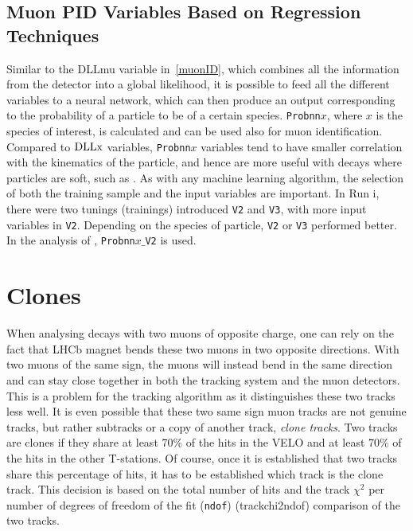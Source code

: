 \subsection{Muon PID Variables Based on Regression Techniques }
\label{muonPIDprobnn}
Similar to the DLLmu variable in~\autoref{muonID}, which combines all the information from the detector into a global likelihood, it is possible to feed all the different variables to a neural network, which can then produce an output corresponding to the probability of a particle to be of a certain species. \texttt{Probnn${x}$}, where $x$ is the species of interest, is calculated and can be used also for muon identification. Compared to $\rm{DLLx}$ variables, \texttt{Probnn${x}$} variables tend to have smaller correlation with the kinematics of the particle, and hence are more useful with decays where particles are soft, such as \Bmumumu. As with any machine learning algorithm, the selection of both the training sample and the input variables are important. In Run \Rn{1}, there were two tunings (trainings) introduced \texttt{V2} and \texttt{V3}, with more input variables in \texttt{V2}. Depending on the species of particle, \texttt{V2} or \texttt{V3} performed better. In the analysis of \Bmumumu, \texttt{Probnn${x}\_$V2} is used.


\section{Clones}
\label{cloniatkos}
When analysing decays with two muons of opposite charge, one can rely on the fact that \gls{LHCb} magnet bends these two muons in two opposite directions. With two muons of the same sign, the muons will instead bend in the same direction and can stay close together in both the tracking system and the muon detectors. This is a problem for the tracking algorithm as it distinguishes these two tracks less well. It is even possible that these two same sign muon tracks are not genuine tracks, but rather subtracks or a copy of another track, \textit{clone tracks}. Two tracks are clones if they share at least 70\% of the hits in the \gls{VELO} and at least 70\% of the hits in the other T-stations. Of course, once it is established that two tracks share this percentage of hits, it has to be established which track is the clone track. This decision is based on the total number of hits and the track $\chi^{2}$ per number of degrees of freedom of the fit (\texttt{ndof}) (\gls{trackchi2ndof}) comparison of the two tracks.   


